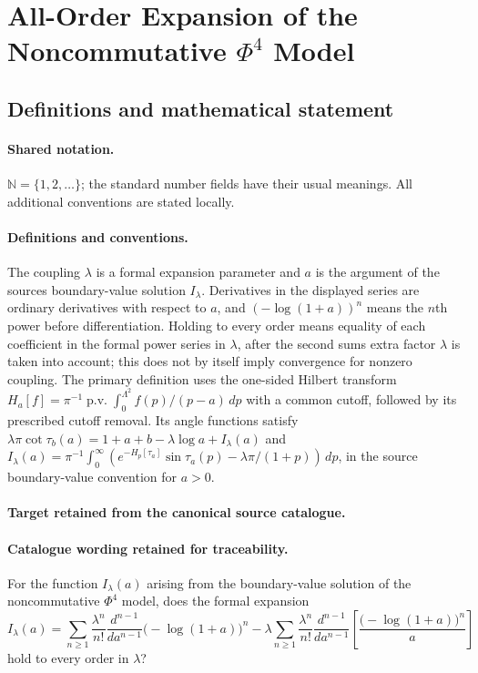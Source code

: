 \documentclass[11pt]{article}
\begin{document}
\section{All-Order Expansion of the Noncommutative $\Phi^4$ Model}\label{statement}

\subsection{Definitions and mathematical statement}

\paragraph{Shared notation.}$\mathbb N=\{1,2,\ldots\}$; the standard number fields have their usual meanings. All additional conventions are stated locally.


\paragraph{Definitions and conventions.}
The coupling $\lambda$ is a formal expansion parameter and $a$ is the argument of the source\textquotesingle s boundary-value solution $I_\lambda$. Derivatives in the displayed series are ordinary derivatives with respect to $a$, and $(-\log(1+a))^n$ means the $n$th power before differentiation. Holding to every order means equality of each coefficient in the formal power series in $\lambda$, after the second sum\textquotesingle s extra factor $\lambda$ is taken into account; this does not by itself imply convergence for nonzero coupling. The primary definition uses the one-sided Hilbert transform $H_a[f]=\pi^{-1}\operatorname{p.v.}\int_0^{\Lambda^2}f(p)/(p-a)\,dp$ with a common cutoff, followed by its prescribed cutoff removal. Its angle functions satisfy $\lambda\pi\cot\tau_b(a)=1+a+b-\lambda\log a+I_\lambda(a)$ and $I_\lambda(a)=\pi^{-1}\int_0^\infty(e^{-H_p[\tau_a]}\sin\tau_a(p)-\lambda\pi/(1+p))\,dp$, in the source boundary-value convention for $a>0$.

\paragraph{Target retained from the canonical source catalogue.}
\paragraph{Catalogue wording retained for traceability.}
For the function $I_\lambda(a)$ arising from the boundary-value solution of the noncommutative $\Phi^4$ model, does the formal expansion
$$
I_\lambda(a)=\sum_{n\geq1}\frac{\lambda^n}{n!}\frac{d^{n-1}}{da^{n-1}}\bigl(-\log(1+a)\bigr)^n
-\lambda\sum_{n\geq1}\frac{\lambda^n}{n!}\frac{d^{n-1}}{da^{n-1}}\left[\frac{\bigl(-\log(1+a)\bigr)^n}{a}\right]
$$
hold to every order in $\lambda$?
\end{document}
